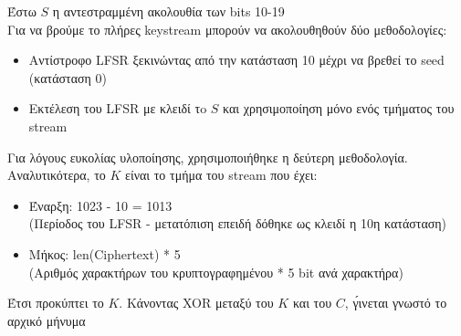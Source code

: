 \documentclass[a4paper, 11pt]{article}
\newcommand{\lt}{\latintext}
\begin{document}
\noindent Έστω $S$ η αντεστραμμένη ακολουθία των {\lt bits} 10-19\\

Για να βρούμε το πλήρες {\lt keystream} μπορούν να ακολουθηθούν δύο μεθοδολογίες:

\begin{itemize}
\item Αντίστροφο {\lt LFSR} ξεκινώντας από την κατάσταση 10 μέχρι να βρεθεί το {\lt seed} (κατάσταση 0)
\item Εκτέλεση του {\lt LFSR} με κλειδί τo $S$ και χρησιμοποίηση μόνο ενός τμήματος του {\lt stream}
\end{itemize}

Για λόγους ευκολίας υλοποίησης, χρησιμοποιήθηκε η δεύτερη μεθοδολογία. Αναλυτικότερα, το $Κ$ είναι το τμήμα του {\lt stream} που έχει:\\
\begin{itemize}
\item Έναρξη: 1023 - 10 = 1013 \\(Περίοδος του {\lt LFSR} - μετατόπιση επειδή δόθηκε ως κλειδί η 10η κατάσταση)\\
\item Μήκος: {\lt len(Ciphertext)} * 5 \\(Αριθμός χαρακτήρων του κρυπτογραφημένου * 5 {\lt bit} ανά χαρακτήρα)\\
\end{itemize}

Έτσι προκύπτει το $K$. Κάνοντας {\lt XOR} μεταξύ του $K$ και του $C$, γ́ινεται γνωστό το αρχικό μήνυμα
\end{document}
